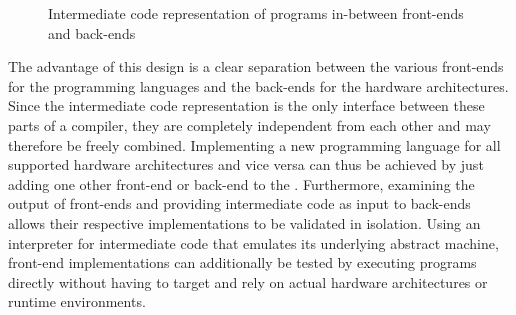 \begin{figure}
\caption[Intermediate code representation of programs]{Intermediate code representation of programs in-between front-ends and back-ends}
\label{fig:cddataflow}
\end{figure}

The advantage of this design is a clear separation between the various front-ends for the programming languages and the back-ends for the hardware architectures.
Since the intermediate code representation is the only interface between these parts of a compiler, they are completely independent from each other and may therefore be freely combined.
Implementing a new programming language for all supported hardware architectures and vice versa can thus be achieved by just adding one other front-end or back-end to the \ecs{}.
Furthermore, examining the output of front-ends and providing intermediate code as input to back-ends allows their respective implementations to be validated in isolation.
Using an interpreter for intermediate code that emulates its underlying abstract machine, front-end implementations can additionally be tested by executing programs directly without having to target and rely on actual hardware architectures or runtime environments.

